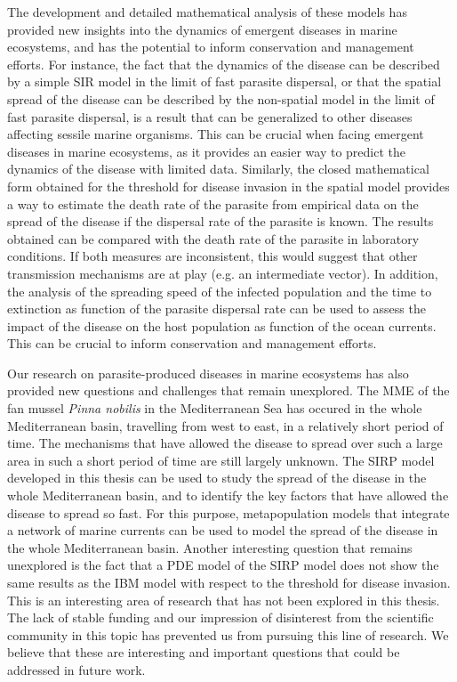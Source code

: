 The development and detailed mathematical analysis of these models has provided
new insights into the dynamics of emergent diseases in marine ecosystems, and
has the potential to inform conservation and management efforts. For instance,
the fact that the dynamics of the disease can be described by a simple SIR
model in the limit of fast parasite dispersal, or that the spatial spread of
the disease can be described by the non-spatial model in the limit of fast
parasite dispersal, is a result that can be generalized to other diseases
affecting sessile marine organisms. This can be crucial when facing emergent
diseases in marine ecosystems, as it provides an easier way to predict the
dynamics of the disease with limited data. Similarly, the closed mathematical
form obtained for the threshold for disease invasion in the spatial model
provides a way to estimate the death rate of the parasite from empirical data
on the spread of the disease if the dispersal rate of the parasite is known.
The results obtained can be compared with the death rate of the parasite in
laboratory conditions. If both measures are inconsistent, this would suggest
that other transmission mechanisms are at play (e.g. an intermediate vector).
In addition, the analysis of the spreading speed of the infected population and
the time to extinction as function of the parasite dispersal rate can be used
to assess the impact of the disease on the host population as function of the
ocean currents. This can be crucial to inform conservation and management
efforts.

Our research on parasite-produced diseases in marine ecosystems has also
provided new questions and challenges that remain unexplored. The MME of the
fan mussel \textit{Pinna nobilis} in the Mediterranean Sea has occured
in the whole Mediterranean basin, travelling from west to east, in a relatively
short period of time. The mechanisms that have allowed the disease to spread
over such a large area in such a short period of time are still largely
unknown. The SIRP model developed in this thesis can be used to study the
spread of the disease in the whole Mediterranean basin, and to identify the key
factors that have allowed the disease to spread so fast. For this purpose,
metapopulation models that integrate a network of marine currents can be used
to model the spread of the disease in the whole Mediterranean basin. Another
interesting question that remains unexplored is the fact that a PDE model of
the SIRP model does not show the same results as the IBM model with respect to
the threshold for disease invasion. This is an interesting area of research
that has not been explored in this thesis. The lack of stable funding and our
impression of disinterest from the scientific community in this topic has
prevented us from pursuing this line of research. We believe that these are
interesting and important questions that could be addressed in future work.

